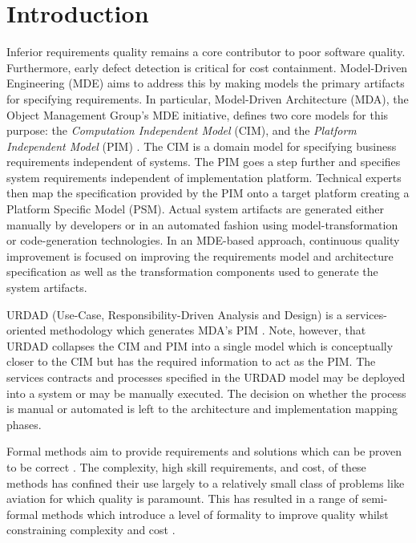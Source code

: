 \section{Introduction}\label{sec:Introduction}

Inferior requirements quality remains a core contributor to poor software quality\cite{heck_experiences_2008,_strategies_2011}. Furthermore, early defect detection is critical for cost containment\cite{betterReferenceThanBoehm1981WhichReliesOnWaterfall}. Model-Driven Engineering (MDE) \cite{frankel_model_2003} aims to address this by making models the primary artifacts for specifying requirements. In particular, Model-Driven Architecture (MDA), the Object Management Group's MDE initiative, defines two core models for this purpose: the \emph{Computation Independent Model} (CIM), and the \emph{Platform Independent Model} (PIM) \cite{_mda_2003}. The CIM is a domain model for specifying business requirements independent of systems. The PIM goes a step further and specifies system requirements independent of implementation platform. Technical experts then map the specification provided by the PIM onto a target platform creating a {Platform Specific Model} (PSM). Actual system artifacts are generated either manually by developers or in an automated fashion using model-transformation or code-generation technologies. In an MDE-based approach, continuous quality improvement is focused on improving the requirements model and architecture specification as well as the transformation components used to generate the system artifacts.

URDAD (Use-Case, Responsibility-Driven Analysis and Design) \cite{solms_technology_2007} is a services-oriented methodology which generates MDA's PIM \cite{solms_generating_2009}. Note, however, that URDAD collapses the CIM and PIM into a single model which is conceptually closer to the CIM but has the required information to act as the PIM. The services contracts and processes specified in the URDAD model may be deployed into a system or may be manually executed. The decision on whether the process is manual or automated is left to the architecture and implementation mapping phases. 

Formal methods aim to provide requirements and solutions which can be proven to be correct \cite{hinchey_software_2008}. The complexity, high skill requirements, and cost, of these methods has confined their use largely to a relatively small class of problems like aviation \cite{hall_software_1992} for which quality is paramount. This has resulted in a range of semi-formal methods which introduce a level of formality to improve quality whilst constraining complexity and cost \cite{}.

